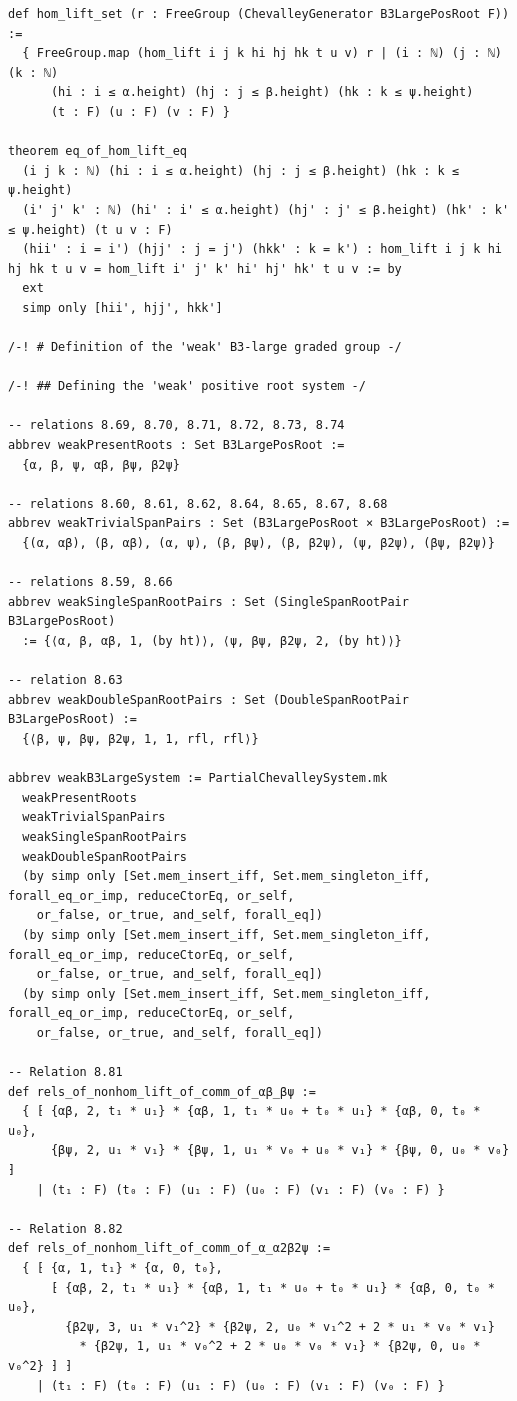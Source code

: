 \documentclass[10pt,a4paper]{article}
\begin{document}
\begin{Verbatim}
def hom_lift_set (r : FreeGroup (ChevalleyGenerator B3LargePosRoot F)) :=
  { FreeGroup.map (hom_lift i j k hi hj hk t u v) r | (i : ℕ) (j : ℕ) (k : ℕ)
      (hi : i ≤ α.height) (hj : j ≤ β.height) (hk : k ≤ ψ.height)
      (t : F) (u : F) (v : F) }

theorem eq_of_hom_lift_eq
  (i j k : ℕ) (hi : i ≤ α.height) (hj : j ≤ β.height) (hk : k ≤ ψ.height)
  (i' j' k' : ℕ) (hi' : i' ≤ α.height) (hj' : j' ≤ β.height) (hk' : k' ≤ ψ.height) (t u v : F)
  (hii' : i = i') (hjj' : j = j') (hkk' : k = k') : hom_lift i j k hi hj hk t u v = hom_lift i' j' k' hi' hj' hk' t u v := by
  ext
  simp only [hii', hjj', hkk']

/-! # Definition of the 'weak' B3-large graded group -/

/-! ## Defining the 'weak' positive root system -/

-- relations 8.69, 8.70, 8.71, 8.72, 8.73, 8.74
abbrev weakPresentRoots : Set B3LargePosRoot :=
  {α, β, ψ, αβ, βψ, β2ψ}

-- relations 8.60, 8.61, 8.62, 8.64, 8.65, 8.67, 8.68
abbrev weakTrivialSpanPairs : Set (B3LargePosRoot × B3LargePosRoot) :=
  {(α, αβ), (β, αβ), (α, ψ), (β, βψ), (β, β2ψ), (ψ, β2ψ), (βψ, β2ψ)}

-- relations 8.59, 8.66
abbrev weakSingleSpanRootPairs : Set (SingleSpanRootPair B3LargePosRoot)
  := {⟨α, β, αβ, 1, (by ht)⟩, ⟨ψ, βψ, β2ψ, 2, (by ht)⟩}

-- relation 8.63
abbrev weakDoubleSpanRootPairs : Set (DoubleSpanRootPair B3LargePosRoot) :=
  {⟨β, ψ, βψ, β2ψ, 1, 1, rfl, rfl⟩}

abbrev weakB3LargeSystem := PartialChevalleySystem.mk
  weakPresentRoots
  weakTrivialSpanPairs
  weakSingleSpanRootPairs
  weakDoubleSpanRootPairs
  (by simp only [Set.mem_insert_iff, Set.mem_singleton_iff, forall_eq_or_imp, reduceCtorEq, or_self,
    or_false, or_true, and_self, forall_eq])
  (by simp only [Set.mem_insert_iff, Set.mem_singleton_iff, forall_eq_or_imp, reduceCtorEq, or_self,
    or_false, or_true, and_self, forall_eq])
  (by simp only [Set.mem_insert_iff, Set.mem_singleton_iff, forall_eq_or_imp, reduceCtorEq, or_self,
    or_false, or_true, and_self, forall_eq])

-- Relation 8.81
def rels_of_nonhom_lift_of_comm_of_αβ_βψ :=
  { ⁅ {αβ, 2, t₁ * u₁} * {αβ, 1, t₁ * u₀ + t₀ * u₁} * {αβ, 0, t₀ * u₀},
      {βψ, 2, u₁ * v₁} * {βψ, 1, u₁ * v₀ + u₀ * v₁} * {βψ, 0, u₀ * v₀} ⁆
    | (t₁ : F) (t₀ : F) (u₁ : F) (u₀ : F) (v₁ : F) (v₀ : F) }

-- Relation 8.82
def rels_of_nonhom_lift_of_comm_of_α_α2β2ψ :=
  { ⁅ {α, 1, t₁} * {α, 0, t₀},
      ⁅ {αβ, 2, t₁ * u₁} * {αβ, 1, t₁ * u₀ + t₀ * u₁} * {αβ, 0, t₀ * u₀},
        {β2ψ, 3, u₁ * v₁^2} * {β2ψ, 2, u₀ * v₁^2 + 2 * u₁ * v₀ * v₁}
          * {β2ψ, 1, u₁ * v₀^2 + 2 * u₀ * v₀ * v₁} * {β2ψ, 0, u₀ * v₀^2} ⁆ ⁆
    | (t₁ : F) (t₀ : F) (u₁ : F) (u₀ : F) (v₁ : F) (v₀ : F) }


\end{Verbatim}
\end{document}
